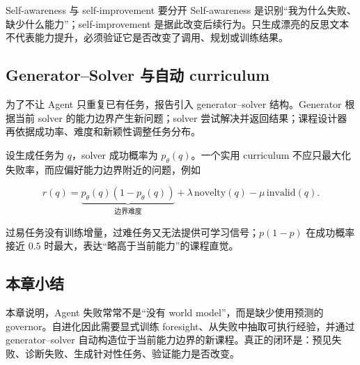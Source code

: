 
\begin{importantbox}{Self-awareness 与 self-improvement 要分开}
Self-awareness 是识别“我为什么失败、缺少什么能力”；self-improvement 是据此改变后续行为。只生成漂亮的反思文本不代表能力提升，必须验证它是否改变了调用、规划或训练结果。
\end{importantbox}



\subsection{Generator--Solver 与自动 curriculum}

为了不让 Agent 只重复已有任务，报告引入 generator--solver 结构。Generator 根据当前 solver 的能力边界产生新问题；solver 尝试解决并返回结果；课程设计器再依据成功率、难度和新颖性调整任务分布。



设生成任务为 $q$，solver 成功概率为 $p_\theta(q)$。一个实用 curriculum 不应只最大化失败率，而应偏好能力边界附近的问题，例如

$$
r(q)=\underbrace{p_\theta(q)(1-p_\theta(q))}_{\text{边界难度}}
+\lambda\,\mathrm{novelty}(q)-\mu\,\mathrm{invalid}(q).
$$

过易任务没有训练增量，过难任务又无法提供可学习信号；$p(1-p)$ 在成功概率接近 $0.5$ 时最大，表达“略高于当前能力”的课程直觉。



\subsection{本章小结}

本章说明，Agent 失败常常不是“没有 world model”，而是缺少使用预测的 governor。自进化因此需要显式训练 foresight、从失败中抽取可执行经验，并通过 generator--solver 自动构造位于当前能力边界的新课程。真正的闭环是：预见失败、诊断失败、生成针对性任务、验证能力是否改变。

